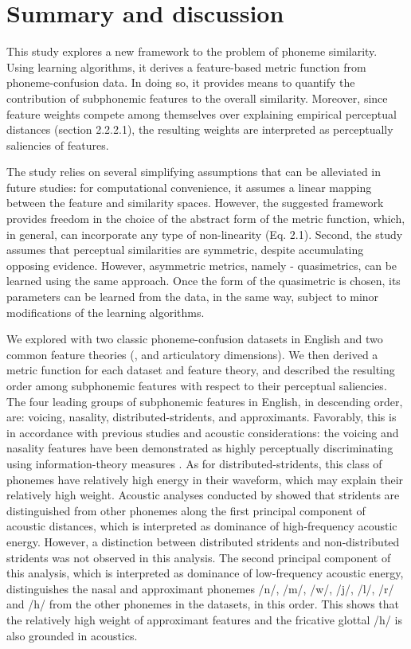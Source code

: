 \section{Summary and discussion}
This study explores a new framework to the problem of phoneme similarity. Using learning algorithms, it derives a feature-based metric function from phoneme-confusion data. In doing so, it provides means to quantify the contribution of subphonemic features to the overall similarity. Moreover, since feature weights compete among themselves over explaining empirical perceptual distances (section 2.2.2.1), the resulting weights are interpreted as perceptually saliencies of features.

The study relies on several simplifying assumptions that can be alleviated in future studies: for computational convenience, it assumes a linear mapping between the feature and similarity spaces. However, the suggested framework provides freedom in the choice of the abstract form of the metric function, which, in general, can incorporate any type of non-linearity (Eq. 2.1). Second, the study assumes that perceptual similarities are symmetric, despite accumulating opposing evidence. However, asymmetric metrics, namely - quasimetrics, can be learned using the same approach. Once the form of the quasimetric is chosen, its parameters can be learned from the data, in the same way, subject to minor modifications of the learning algorithms. 

We explored with two classic phoneme-confusion datasets in English \citep{NicelyMiller1955, Luce1987} and two common feature theories (\citealp{ChomskyHalle1968}, and articulatory dimensions). We then derived a metric function for each dataset and feature theory, and described the resulting order among subphonemic features with respect to their perceptual saliencies. The four leading groups of subphonemic features in English, in descending order, are: voicing, nasality, distributed-stridents, and approximants. Favorably, this is in accordance with previous studies and acoustic considerations: the voicing and nasality features have been demonstrated as highly perceptually discriminating using information-theory measures \citep{NicelyMiller1955}. As for distributed-stridents, this class of phonemes have relatively high energy in their waveform, which may explain their relatively high weight. Acoustic analyses conducted by \citep[see][Figure 15]{Mielke2012} showed that stridents are distinguished from other phonemes along the first principal component of acoustic distances, which is interpreted as dominance of high-frequency acoustic energy. However, a distinction between distributed stridents and non-distributed stridents was not observed in this analysis. The second principal component of this analysis, which is interpreted as dominance of low-frequency acoustic energy, distinguishes the nasal and approximant phonemes /n/, /m/, /w/, /j/, /l/, /r/ and /h/ from the other phonemes in the datasets, in this order. This shows that the relatively high weight of approximant features and the fricative glottal /h/ is also grounded in acoustics.


